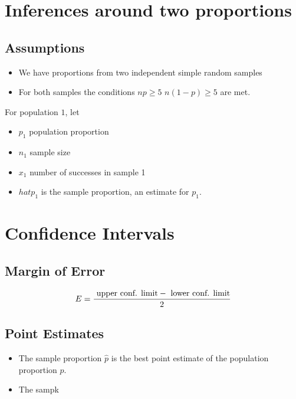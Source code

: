 \documentclass[]{report}
\begin{document}
\section{Inferences around two proportions}

{
\subsection{Assumptions}

\begin{itemize}
\item We have proportions from two independent simple random samples
\item For both samples the conditions $np \geq 5$ $ n(1-p) \geq 5$ are met.
\end{itemize}
For population $1$, let
\begin{itemize}
\item $p_1$  population proportion
\item $n_1$ sample size
\item $x_1$ number of successes in sample 1
\item $hat{p}_1$ is the sample proportion, an estimate for $p_1$.
\end{itemize}





\section{Confidence Intervals}

{
\subsection{Margin of Error}

\[ E = {\mbox{ upper conf. limit} - \mbox{ lower conf. limit} \over 2} \]

\subsection{Point Estimates}
\begin{itemize}
\item The sample proportion $\hat{p}$ is the best point estimate of the population proportion $p$.
\item The sampk
\end{itemize}

}}
\end{document}
